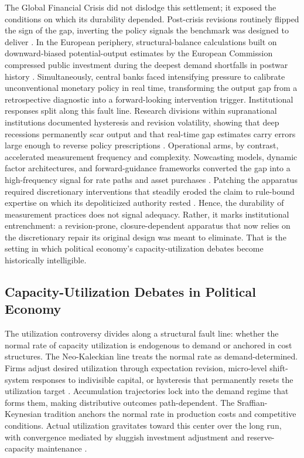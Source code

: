 \documentclass[11pt]{article}
\begin{document}
The Global Financial Crisis did not dislodge this settlement; it exposed the conditions on which its durability depended. Post-crisis revisions routinely flipped the sign of the gap, inverting the policy signals the benchmark was designed to deliver \citep{Kavrik2026}. In the European periphery, structural-balance calculations built on downward-biased potential-output estimates by the European Commission compressed public investment during the deepest demand shortfalls in postwar history \citep{Heimberger2017, Heimberger2020}. Simultaneously, central banks faced intensifying pressure to calibrate unconventional monetary policy in real time, transforming the output gap from a retrospective diagnostic into a forward-looking intervention trigger. Institutional responses split along this fault line. Research divisions within supranational institutions documented hysteresis and revision volatility, showing that deep recessions permanently scar output and that real-time gap estimates carry errors large enough to reverse policy prescriptions \citep{CerraSaxena2017, CerraFatasSaxena2023, BarkemaGudmundssonMrkaic2020}. Operational arms, by contrast, accelerated measurement frequency and complexity. Nowcasting models, dynamic factor architectures, and forward-guidance frameworks converted the gap into a high-frequency signal for rate paths and asset purchases \citep{AastveitTrovik2014, Berger2023}. Patching the apparatus required discretionary interventions that steadily eroded the claim to rule-bound expertise on which its depoliticized authority rested \citep{Foster2024, ArgyroulisVagdoutis2025}. Hence, the durability of measurement practices does not signal adequacy. Rather, it marks institutional entrenchment: a revision-prone, closure-dependent apparatus that now relies on the discretionary repair its original design was meant to eliminate. That is the setting in which political economy's capacity-utilization debates become historically intelligible.

\subsection{Capacity-Utilization Debates in Political Economy}
\label{subsec:pe_utilization_debates}

The utilization controversy divides along a structural fault line: whether the normal rate of capacity utilization is endogenous to demand or anchored in cost structures. The Neo-Kaleckian line treats the normal rate as demand-determined. Firms adjust desired utilization through expectation revision, micro-level shift-system responses to indivisible capital, or hysteresis that permanently resets the utilization target \citep{Lavoie1995, Nikiforos2013, Setterfield2020}. Accumulation trajectories lock into the demand regime that forms them, making distributive outcomes path-dependent. The Sraffian-Keynesian tradition anchors the normal rate in production costs and competitive conditions. Actual utilization gravitates toward this center over the long run, with convergence mediated by sluggish investment adjustment and reserve-capacity maintenance \citep{Ciccone1986}.
\end{document}
